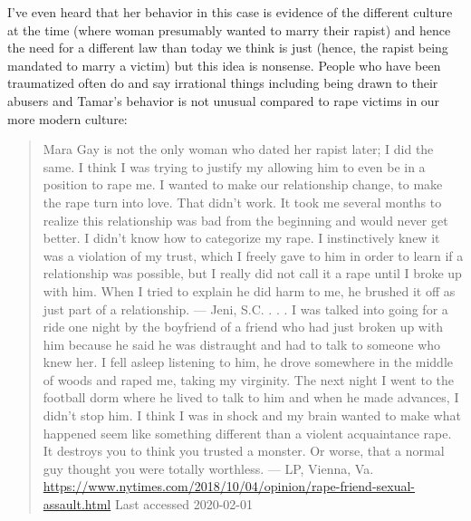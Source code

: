 \documentclass[11pt]{article}
\begin{document}
I've even heard that her behavior in this case is evidence of the different culture at the time (where woman presumably wanted to marry their rapist) and hence the need for a different law than today we think is just (hence, the rapist being mandated to marry a victim) but this idea is nonsense. People who have been traumatized often do and say irrational things including being drawn to their abusers and Tamar's behavior is not unusual compared to rape victims in our more modern culture:

\begin{quote}
Mara Gay is not the only woman who dated her rapist later; I did the same. I think I was trying to justify my allowing him to even be in a position to rape me. I wanted to make our relationship change, to make the rape turn into love. That didn’t work. It took me several months to realize this relationship was bad from the beginning and would never get better. I didn’t know how to categorize my rape. I instinctively knew it was a violation of my trust, which I freely gave to him in order to learn if a relationship was possible, but I really did not call it a rape until I broke up with him. When I tried to explain he did harm to me, he brushed it off as just part of a relationship. — Jeni, S.C.
. . . 
I was talked into going for a ride one night by the boyfriend of a friend who had just broken up with him because he said he was distraught and had to talk to someone who knew her. I fell asleep listening to him, he drove somewhere in the middle of woods and raped me, taking my virginity. The next night I went to the football dorm where he lived to talk to him and when he made advances, I didn’t stop him. I think I was in shock and my brain wanted to make what happened seem like something different than a violent acquaintance rape. It destroys you to think you trusted a monster. Or worse, that a normal guy thought you were totally worthless. — LP, Vienna, Va.
\url{https://www.nytimes.com/2018/10/04/opinion/rape-friend-sexual-assault.html} Last accessed 2020-02-01
\end{quote}

\end{document}
